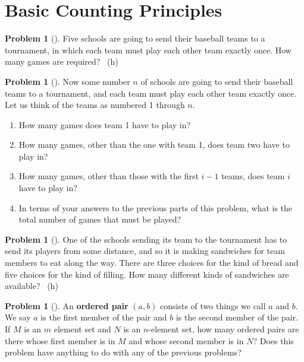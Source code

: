 \documentclass[10pt,]{book}
\newcommand{\terminology}[1]{\textbf{#1}}
\theoremstyle{plain}
\theoremstyle{definition}
\newtheorem{activity}[project]{Problem}
\theoremstyle{definition}
\numberwithin{equation}{chapter}
\begin{document}
\section[{Basic Counting Principles}]{Basic Counting Principles}\label{s1-2-basics}
\begin{activity}[] \label{fiveteamtournament}
\hypertarget{p-28}{}%
Five schools are going to send their baseball teams to a tournament, in which each team must play each other team exactly once. How many games are required?%
~{\tiny (h)}\end{activity}
\begin{activity}[] \label{baseball2}
\hypertarget{p-31}{}%
Now some number \(n\) of schools are going to send their baseball teams to a tournament, and each team must play each other team exactly once. Let us think of the teams as numbered 1 through \(n\).%
\begin{enumerate}[font=\bfseries,label=(\alph*),ref=\alph*]
\item\label{task-1} \marginsymbol[-2.5em]{} \hypertarget{p-32}{}%
How many games does  team 1 have to play in?%
\item\label{task-2} \marginsymbol[-2.5em]{} \hypertarget{p-34}{}%
How many games, other than the one with team 1, does team two have to play in?%
\item\label{task-3} \marginsymbol[-2.5em]{} \hypertarget{p-36}{}%
How many games, other than those with the first \(i-1\) teams, does team \(i\) have to play in?%
\item\label{task-4} \marginsymbol[-2.5em]{} \hypertarget{p-38}{}%
In terms of your answers to the previous parts of this problem, what is the total number of games that must be played?%
\end{enumerate}
\end{activity}
\begin{activity}[] \label{basicsandwiches}
\hypertarget{p-40}{}%
One of the schools sending its team to the tournament has to send its players from some distance, and so it is making sandwiches for team members to eat along the way. There are three choices for the kind of bread and five choices for the kind of filling. How many different kinds of sandwiches are available?%
~{\tiny (h)}\end{activity}
\begin{activity}[] \label{orderedpair}
\hypertarget{p-43}{}%
An \terminology{ordered pair} \((a,b)\) consists of two things we call \(a\) and \(b\). We say \(a\) is the first member of the pair and \(b\) is the second member of the pair. If \(M\) is an \(m\) element set and \(N\) is an \(n\)-element set, how many ordered pairs are there whose first member is in \(M\) and whose second member is in \(N\)? Does this problem have anything to do with any of the previous problems?%
\end{activity}
\end{document}
